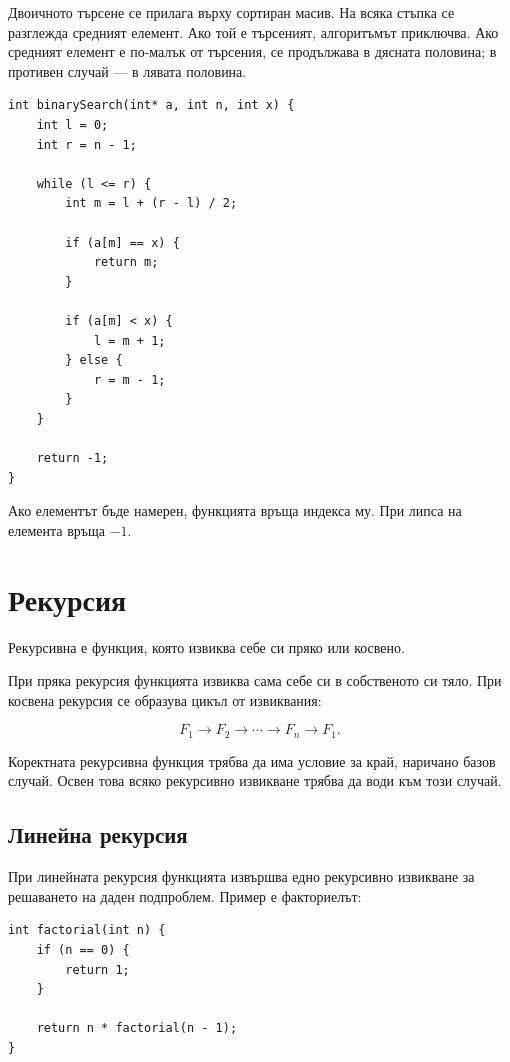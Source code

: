 Двоичното търсене се прилага върху сортиран масив. На всяка стъпка се разглежда средният елемент. Ако той е търсеният, алгоритъмът приключва. Ако средният елемент е по-малък от търсения, се продължава в дясната половина; в противен случай --- в лявата половина.

\begin{verbatim}
int binarySearch(int* a, int n, int x) {
    int l = 0;
    int r = n - 1;

    while (l <= r) {
        int m = l + (r - l) / 2;

        if (a[m] == x) {
            return m;
        }

        if (a[m] < x) {
            l = m + 1;
        } else {
            r = m - 1;
        }
    }

    return -1;
}
\end{verbatim}

Ако елементът бъде намерен, функцията връща индекса му. При липса на елемента връща $-1$.

\section{Рекурсия}\label{s:15.6}

\begin{defn}
Рекурсивна е функция, която извиква себе си пряко или косвено.
\end{defn}

При пряка рекурсия функцията извиква сама себе си в собственото си тяло. При косвена рекурсия се образува цикъл от извиквания:

\[
F_1\to F_2\to\cdots\to F_n\to F_1.
\]

Коректната рекурсивна функция трябва да има условие за край, наричано базов случай. Освен това всяко рекурсивно извикване трябва да води към този случай.

\subsection{Линейна рекурсия}\label{s:15.6.1}

При линейната рекурсия функцията извършва едно рекурсивно извикване за решаването на даден подпроблем. Пример е факториелът:

\begin{verbatim}
int factorial(int n) {
    if (n == 0) {
        return 1;
    }

    return n * factorial(n - 1);
}
\end{verbatim}


